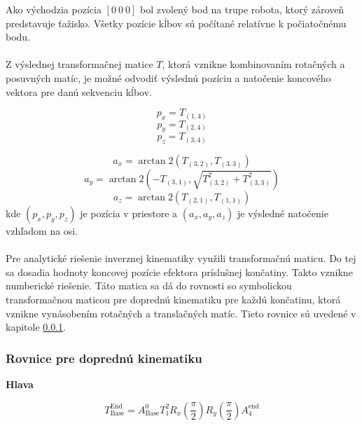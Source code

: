 Ako východzia pozícia $[0~0~0]$ bol zvolený bod na trupe robota, ktorý zároveň predstavuje ťažisko. Všetky pozície kĺbov sú počítané relatívne k počiatočnému bodu.
\\\\
Z výslednej transformačnej matice $T$, ktorá vznikne kombinovaním rotačných a posuvných matíc, je možné odvodiť výslednú pozíciu a natočenie koncového vektora pre danú sekvenciu kĺbov.


\begin{equation}
p_x = T_{\left(1,4\right)}
\end{equation}
\begin{equation}
p_y = T_{\left(2,4\right)}
\end{equation}
\begin{equation}
p_z = T_{\left(3,4\right)}
\end{equation}

\begin{equation}
a_x = \arctan2\left(T_{\left(3,2\right)},T_{\left(3,3\right)}\right)
\end{equation}
\begin{equation}
a_y = \arctan2\left(-T_{\left(3,1\right)},\sqrt{T_{\left(3,2\right)}^2 + T_{\left(3,3\right)}^2}\right)
\end{equation}
\begin{equation}
a_z = \arctan2\left(T_{\left(2,1\right)},T_{\left(1,1\right)}\right)
\end{equation}
kde $(p_x, p_y, p_z)$ je pozícia v priestore a $(a_x, a_y, a_z)$ je výsledné natočenie vzhľadom na osi.
\\\\
Pre analytické riešenie inverznej kinematiky využili transformačnú maticu. Do tej sa dosadia hodnoty koncovej pozície efektora príslušnej končatiny. Takto vznikne numberické riešenie. Táto matica sa dá do rovnosti so symbolickou transformačnou maticou pre doprednú kinematiku pre každú končatinu, ktorá vznikne vynásobením rotačných a translačných matíc. Tieto rovnice sú uvedené v kapitole \ref{sec_forward_kinematics_equations}.


\subsubsection{Rovnice pre doprednú kinematiku}\label{sec_forward_kinematics_equations}
 

\textbf{Hlava}

\begin{equation}
T_{\text{Base}}^{\text{End}} = A_{\text{Base}}^{0} T_{1}^{2} R_{x}\left(\frac{\pi}{2}\right) R_{y}\left(\frac{\pi}{2}\right) A_{4}^{\text{end}}
\end{equation}

